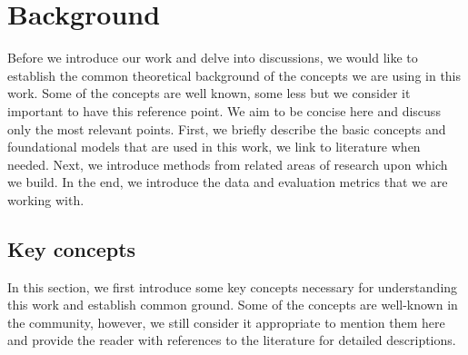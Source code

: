 \chapter{Background}%
\label{chap:background}
Before we introduce our work and delve into discussions, we would like to establish the common theoretical background of the concepts we are using in this work.
Some of the concepts are well known, some less but we consider it important to have this reference point.
We aim to be concise here and discuss only the most relevant points.
First, we briefly describe the basic concepts and foundational models that are used in this work, we link to literature when needed.
Next, we introduce methods from related areas of research upon which we build.
In the end, we introduce the data and evaluation metrics that we are working with.

\section{Key concepts}
\label{02:sec:basics}
In this section, we first introduce some key concepts necessary for understanding this work and establish common ground.
Some of the concepts are well-known in the community, however, we still consider it appropriate to mention them here and provide the reader with references to the literature for detailed descriptions.

